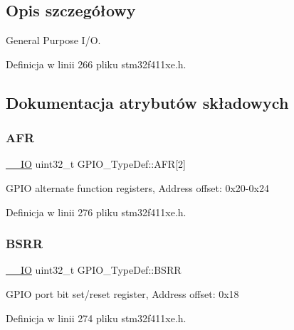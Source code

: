 \subsection{Opis szczegółowy}
General Purpose I/O. 

Definicja w linii 266 pliku stm32f411xe.\+h.



\subsection{Dokumentacja atrybutów składowych}
\mbox{\label{struct_g_p_i_o___type_def_a2245603433e102f0fd8a85f7de020755}} 
\subsubsection{\texorpdfstring{A\+FR}{AFR}}
{\footnotesize\ttfamily \hyperlink{core__sc300_8h_aec43007d9998a0a0e01faede4133d6be}{\+\_\+\+\_\+\+IO} uint32\+\_\+t G\+P\+I\+O\+\_\+\+Type\+Def\+::\+A\+FR\mbox{[}2\mbox{]}}

G\+P\+IO alternate function registers, Address offset\+: 0x20-\/0x24 

Definicja w linii 276 pliku stm32f411xe.\+h.

\mbox{\label{struct_g_p_i_o___type_def_acd6f21e08912b484c030ca8b18e11cd6}} 
\subsubsection{\texorpdfstring{B\+S\+RR}{BSRR}}
{\footnotesize\ttfamily \hyperlink{core__sc300_8h_aec43007d9998a0a0e01faede4133d6be}{\+\_\+\+\_\+\+IO} uint32\+\_\+t G\+P\+I\+O\+\_\+\+Type\+Def\+::\+B\+S\+RR}

G\+P\+IO port bit set/reset register, Address offset\+: 0x18 

Definicja w linii 274 pliku stm32f411xe.\+h.

\mbox{\label{struct_g_p_i_o___type_def_acf11156409414ad8841bb0b62959ee96}} 
